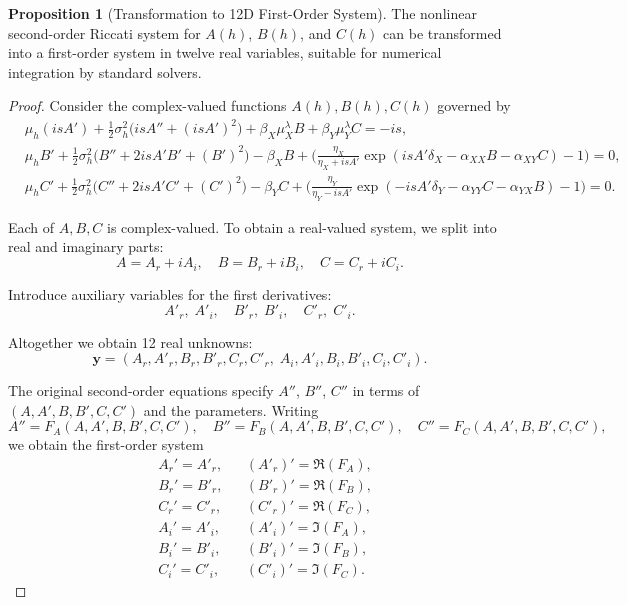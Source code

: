 \documentclass{article}
\theoremstyle{definition}
\newtheorem{proposition}{Proposition}[section]
\begin{document}
\begin{proposition}[Transformation to 12D First-Order System]
\label{prop:12d_transform}
The nonlinear second-order Riccati system for $A(h)$, $B(h)$, and $C(h)$ can be transformed into a first-order system in twelve real variables, suitable for numerical integration by standard solvers.
\end{proposition}

\begin{proof}
Consider the complex-valued functions $A(h), B(h), C(h)$ governed by
\[
\begin{aligned}
& \mu_h (i s A') 
+ \tfrac{1}{2}\sigma_h^2 \big( i s A'' + (i s A')^2 \big)
+ \beta_X \mu_X^\lambda B 
+ \beta_Y \mu_Y^\lambda C 
= - i s, \\[0.8ex]
& \mu_h B' 
+ \tfrac{1}{2}\sigma_h^2 \big( B'' + 2 i s A' B' + (B')^2 \big)
- \beta_X B 
+ \Big( \tfrac{\eta_X}{\eta_X + i s A'} 
\exp\!\left( i s A' \delta_X - \alpha_{XX} B - \alpha_{XY} C \right) - 1 \Big) 
= 0, \\[0.8ex]
& \mu_h C' 
+ \tfrac{1}{2}\sigma_h^2 \big( C'' + 2 i s A' C' + (C')^2 \big)
- \beta_Y C 
+ \Big( \tfrac{\eta_Y}{\eta_Y - i s A'} 
\exp\!\left( -i s A' \delta_Y - \alpha_{YY} C - \alpha_{YX} B \right) - 1 \Big) 
= 0.
\end{aligned}
\]

Each of $A,B,C$ is complex-valued. To obtain a real-valued system, we split into real and imaginary parts:
\[
A = A_r + i A_i, \quad 
B = B_r + i B_i, \quad 
C = C_r + i C_i.
\]

Introduce auxiliary variables for the first derivatives:
\[
A'_r, \; A'_i, \quad 
B'_r, \; B'_i, \quad 
C'_r, \; C'_i.
\]

Altogether we obtain 12 real unknowns:
\[
\mathbf{y} = (A_r, A'_r, B_r, B'_r, C_r, C'_r, \; A_i, A'_i, B_i, B'_i, C_i, C'_i).
\]

The original second-order equations specify $A''$, $B''$, $C''$ in terms of $(A, A', B, B', C, C')$ and the parameters. Writing
\[
A'' = F_A(A, A', B, B', C, C'), \quad
B'' = F_B(A, A', B, B', C, C'), \quad
C'' = F_C(A, A', B, B', C, C'),
\]
we obtain the first-order system
\[
\begin{aligned}
& A_r' = A'_r, && (A'_r)' = \Re(F_A), \\
& B_r' = B'_r, && (B'_r)' = \Re(F_B), \\
& C_r' = C'_r, && (C'_r)' = \Re(F_C), \\
& A_i' = A'_i, && (A'_i)' = \Im(F_A), \\
& B_i' = B'_i, && (B'_i)' = \Im(F_B), \\
& C_i' = C'_i, && (C'_i)' = \Im(F_C).
\end{aligned}
\]


\end{proof}
\end{document}
